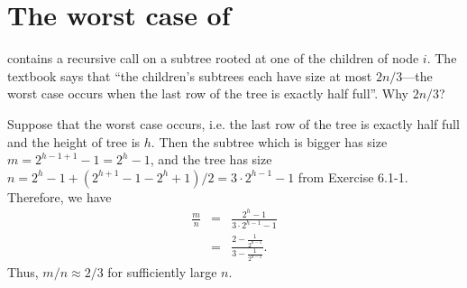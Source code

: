 \documentclass[a4paper, fleqn]{article}
\begin{document}
\section{The worst case of }

 contains a recursive call on a subtree rooted at one of the 
children of node $i$. The textbook says that ``the children's subtrees each 
have size at most $2n/3$---the worst case occurs when the last row of the tree 
is exactly half full''. Why $2n/3$?

Suppose that the worst case occurs, i.e. the last row of the tree is exactly 
half full and the height of tree is $h$. Then the subtree which is bigger has 
size $m = 2^{h-1+1} - 1 = 2^h - 1$, and the tree has size $n = 2^h - 1 + 
(2^{h+1} - 1 - 2^{h} + 1)/2 = 3 \cdot 2^{h-1} - 1$ from Exercise 6.1-1. 
Therefore, we have
\begin{eqnarray*}
\frac{m}{n} & = & \frac{2^h - 1}{3 \cdot 2^{h-1} - 1} \\
            & = & \frac{2 - \frac{1}{2^{h-1}}}{3 - \frac{1}{2^{h-1}}}.
\end{eqnarray*}
Thus, $m/n \approx 2/3$ for sufficiently large $n$.
\end{document}
